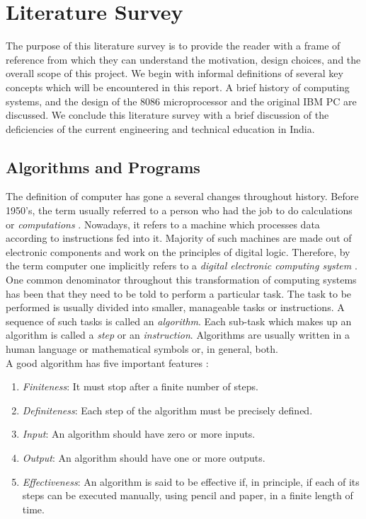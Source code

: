 \section{Literature Survey}
The purpose of this literature survey is to provide the reader with a frame of reference from which they can understand the motivation, design choices, and the overall scope of this project. We begin with informal definitions of several key concepts which will be encountered in this report. A brief history of computing systems, and the design of the 8086 microprocessor and the original IBM PC are discussed. We conclude this literature survey with a brief discussion of the deficiencies of the current engineering and technical education in India.

\subsection{Algorithms and Programs}
The definition of computer has gone a several changes throughout history. Before 1950's, the term usually referred to a person who had the job to do calculations or \textit{computations} \cite{evans2020broad}. Nowadays, it refers to a machine which processes data according to instructions fed into it. Majority of such machines are made out of electronic components and work on the principles of digital logic. Therefore, by the term computer one implicitly refers to a \textit{digital electronic computing system} \cite{ionescu2015categories}.  One common denominator throughout this transformation of computing systems has been that they need to be told to perform a particular task. The task to be performed is usually divided into smaller, manageable tasks or instructions. A sequence of such tasks is called an \textit{algorithm}. Each sub-task which makes up an algorithm is called a \textit{step} or an \textit{instruction}. Algorithms are usually written in a human language or mathematical symbols or, in general, both.\\
A good algorithm has five important features \cite{knuth1997art}:
\begin{enumerate}
\item \textit{Finiteness}: It must stop after a finite number of steps.
\item \textit{Definiteness}: Each step of the algorithm must be precisely defined.
\item \textit{Input}: An algorithm should have zero or more inputs.
\item \textit{Output}: An algorithm should have one or more outputs.
\item \textit{Effectiveness}: An algorithm is said to be effective if, in principle, if each of its steps can be executed manually, using pencil and paper, in a finite length of time.
\end{enumerate}
